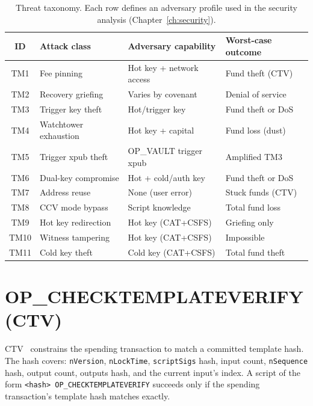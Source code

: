 \begin{table}[t]
\centering
\caption{Threat taxonomy. Each row defines an adversary profile used in the security
analysis (Chapter~\ref{ch:security}).}
\label{tab:threat_summary}
\small
\begin{tabular}{@{}clll@{}}
\toprule
ID & Attack class & Adversary capability & Worst-case outcome \\
\midrule
TM1  & Fee pinning            & Hot key + network access    & Fund theft (CTV) \\
TM2  & Recovery griefing      & Varies by covenant          & Denial of service \\
TM3  & Trigger key theft      & Hot/trigger key             & Fund theft or DoS \\
TM4  & Watchtower exhaustion  & Hot key + capital           & Fund loss (dust) \\
TM5  & Trigger xpub theft     & OP\_VAULT trigger xpub      & Amplified TM3 \\
TM6  & Dual-key compromise    & Hot + cold/auth key         & Fund theft or DoS \\
TM7  & Address reuse          & None (user error)           & Stuck funds (CTV) \\
TM8  & CCV mode bypass        & Script knowledge            & Total fund loss \\
TM9  & Hot key redirection    & Hot key (CAT+CSFS)          & Griefing only \\
TM10 & Witness tampering      & Hot key (CAT+CSFS)          & Impossible \\
TM11 & Cold key theft         & Cold key (CAT+CSFS)         & Total fund theft \\
\bottomrule
\end{tabular}
\end{table}

\section{OP\_CHECKTEMPLATEVERIFY (CTV)} \label{se:ctv}

CTV~\cite{BIP119} constrains the spending transaction to match a committed template
hash. The hash covers: \texttt{nVersion}, \texttt{nLockTime}, \texttt{scriptSigs} hash,
input count, \texttt{nSequence} hash, output count, outputs hash, and the current
input's index. A script of the form \texttt{<hash> OP\_CHECKTEMPLATEVERIFY} succeeds
only if the spending transaction's template hash matches exactly.


